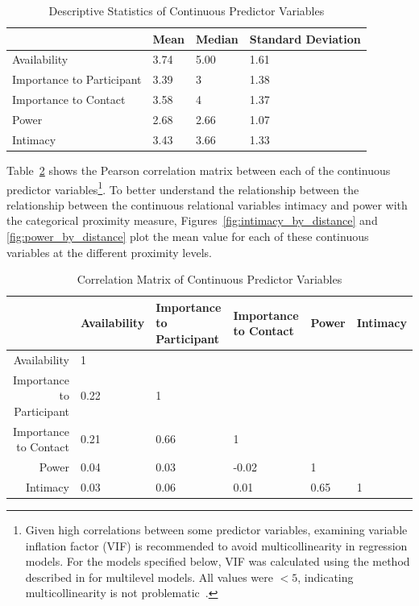 \documentclass[12pt]{nuthesis}	%
\begin{document}
\begin{table}[ht]
\fontsize{11}{11.5}\selectfont \centering 
\begin{tabular}{llll}
\hline
                          & Mean & Median & Standard Deviation \\ \hline
Availability              & 3.74 & 5.00   & 1.61               \\
Importance to Participant & 3.39 & 3      & 1.38               \\
Importance to Contact     & 3.58 & 4      & 1.37               \\
Power                     & 2.68 & 2.66   & 1.07               \\
Intimacy                  & 3.43 & 3.66   & 1.33               \\ \hline
\end{tabular}
\caption{Descriptive Statistics of Continuous Predictor Variables}
\label{tab:descriptives}
\end{table}

Table~\ref{tab:correlation} shows the Pearson correlation matrix between each of the continuous predictor variables\footnote{Given high correlations between some predictor variables, examining variable inflation factor (VIF) is recommended to avoid multicollinearity in regression models. For the models specified below, VIF was calculated using the method described in \citet{zuur2009mixed} for multilevel models. All values were $< 5$, indicating multicollinearity is not problematic~\citep{sheather2009modern}.}. To better understand the relationship between the relationship between the continuous relational variables intimacy and power with the categorical proximity measure, Figures~\ref{fig:intimacy_by_distance} and \ref{fig:power_by_distance} plot the mean value for each of these continuous variables at the different proximity levels.

\begin{table}[ht] 
\fontsize{9}{9.5}\selectfont \centering 
\begin{tabular}{rlllll}
  \hline
 & Availability & Importance to Participant & Importance to Contact & Power & Intimacy \\ 
  \hline
Availability & 1 &  &  &  &  \\ 
  Importance to Participant & 0.22 & 1 &  &  &  \\ 
  Importance to Contact & 0.21 & 0.66 & 1 &  &  \\ 
  Power & 0.04 & 0.03 & -0.02 & 1 &  \\ 
  Intimacy & 0.03 & 0.06 & 0.01 & 0.65 & 1 \\ 
   \hline
\end{tabular}
  \caption{Correlation Matrix of Continuous Predictor Variables} 
  \label{tab:correlation} 
\end{table}
\end{document}
